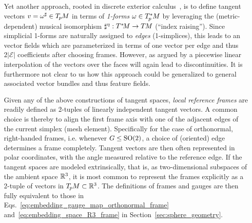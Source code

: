 Yet another approach, rooted in discrete exterior calculus~\cite{desbrun2005DiscreteExteriorCalculus,elcott2005building}, is to define tangent vectors $v = \omega^\sharp \in T_{\mkern-1.5mu p}\mkern-.5muM$ in terms of \emph{1-forms} $\omega \in T_{\mkern-1.5mu p}^{\mkern-0mu *}\mkern-1muM$ by leveraging the (metric-dependent) musical isomorphism $\sharp^\eta: T^{\mkern0.5mu *}\mkern-3.5muM \to T\mkern-1.5muM$ (``index raising'').
Since simplicial 1-forms are naturally assigned to \emph{edges} (1-simplices), this leads to an vector fields which are parameterized in terms of one vector per edge and thus $2|\mathcal{E}|$ coefficients after choosing frames.
However, as argued by \citet{deGoes2016VectorFieldProcessing} a piecewise linear interpolation of the vectors over the faces will again lead to discontinuities.
It is furthermore not clear to us how this approach could be generalized to general associated vector bundles and thus feature fields.







Given any of the above constructions of tangent spaces, \emph{local reference frames} are readily defined as 2-tuples of linearly independent tangent vectors.
A common choice is thereby to align the first frame axis with one of the adjacent edges of the current simplex (mesh element).
Specifically for the case of orthonormal, right-handed frames, i.e. whenever $G\leq\operatorname{SO}(2)$, a choice of (oriented) edge determines a frame completely.
Tangent vectors are then often represented in polar coordinates, with the angle measured relative to the reference edge.
If the tangent spaces are modeled extrinsically, that is, as two-dimensional subspaces of the ambient space $\mathbb{R}^3$, it is most common to represent the frames explicitly as a 2-tuple of vectors in $T_{\mkern-1.5mu p}\mkern-.5muM \subset \mathbb{R}^3$.
The definitions of frames and gauges are then fully equivalent to those in 
Eqs.~\eqref{eq:embedding_gauge_map_orthonormal_frame} and~\eqref{eq:embedding_space_R3_frame}
in Section~\ref{sec:sphere_geometry}.

